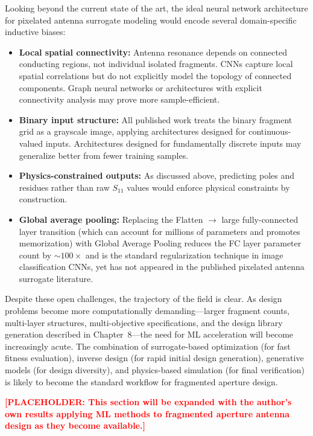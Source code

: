 Looking beyond the current state of the art, the ideal neural network architecture for pixelated antenna surrogate modeling would encode several domain-specific inductive biases:

\begin{itemize}
\item \textbf{Local spatial connectivity:}  Antenna resonance depends on connected conducting regions, not individual isolated fragments.  CNNs capture local spatial correlations but do not explicitly model the topology of connected components.  Graph neural networks or architectures with explicit connectivity analysis may prove more sample-efficient.

\item \textbf{Binary input structure:}  All published work treats the binary fragment grid as a grayscale image, applying architectures designed for continuous-valued inputs.  Architectures designed for fundamentally discrete inputs may generalize better from fewer training samples.

\item \textbf{Physics-constrained outputs:}  As discussed above, predicting poles and residues rather than raw $S_{11}$ values would enforce physical constraints by construction.

\item \textbf{Global average pooling:}  Replacing the Flatten $\rightarrow$ large fully-connected layer transition (which can account for millions of parameters and promotes memorization) with Global Average Pooling reduces the FC layer parameter count by $\sim\!100\times$ and is the standard regularization technique in image classification CNNs, yet has not appeared in the published pixelated antenna surrogate literature.
\end{itemize}

Despite these open challenges, the trajectory of the field is clear.  As design problems become more computationally demanding---larger fragment counts, multi-layer structures, multi-objective specifications, and the design library generation described in Chapter~8---the need for ML acceleration will become increasingly acute.  The combination of surrogate-based optimization (for fast fitness evaluation), inverse design (for rapid initial design generation), generative models (for design diversity), and physics-based simulation (for final verification) is likely to become the standard workflow for fragmented aperture design.

\textcolor{red}{\textbf{[PLACEHOLDER: This section will be expanded with the author's own results applying ML methods to fragmented aperture antenna design as they become available.]}}


